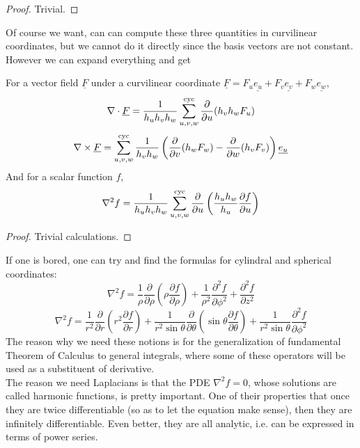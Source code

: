 \begin{proof}
    Trivial.
\end{proof}
Of course we want, can can compute these three quantities in curvilinear coordinates, but we cannot do it directly since the basis vectors are not constant.
However we can expand everything and get
\begin{proposition}
    For a vector field $\underline{F}$ under a curvilinear coordinate $\underline{F}=F_u\underline{e_u}+F_v\underline{e_v}+F_w\underline{e_w}$,
    $$\nabla\cdot\underline{F}=\frac{1}{h_uh_vh_w}\sum_{u,v,w}^{\rm cyc}\frac{\partial}{\partial u}(h_vh_wF_u)$$
    $$\nabla\times\underline{F}=\sum_{u,v,w}^{\rm cyc}\frac{1}{h_vh_w}\left( \frac{\partial}{\partial v}(h_wF_w)-\frac{\partial}{\partial w}(h_vF_v) \right)\underline{e_u}$$
    And for a scalar function $f$,
    $$\nabla^2f=\frac{1}{h_uh_vh_w}\sum_{u,v,w}^{\rm cyc}\frac{\partial}{\partial u}\left(\frac{h_uh_w}{h_u}\frac{\partial f}{\partial u}\right)$$
\end{proposition}
\begin{proof}
    Trivial calculations.
\end{proof}
If one is bored, one can try and find the formulas for cylindral and spherical coordinates:
$$\nabla^2f=\frac{1}{\rho}\frac{\partial}{\partial\rho}\left( \rho\frac{\partial f}{\partial\rho} \right)+\frac{1}{\rho^2}\frac{\partial^2f}{\partial \phi^2}+\frac{\partial^2f}{\partial z^2}$$
$$\nabla^2f=\frac{1}{r^2}\frac{\partial}{\partial r}\left( r^2\frac{\partial f}{\partial r} \right)+\frac{1}{r^2\sin\theta}\frac{\partial}{\partial\theta}\left( \sin\theta\frac{\partial f}{\partial\theta} \right)+\frac{1}{r^2\sin\theta}\frac{\partial^2f}{\partial\phi^2}$$
The reason why we need these notions is for the generalization of fundamental Theorem of Calculus to general integrals, where some of these operators will be used as a substituent of derivative.\\
The reason we need Laplacians is that the PDE $\nabla^2f=0$, whose solutions are called harmonic functions, is pretty important.
One of their properties that once they are twice differentiable (so as to let the equation make sense), then they are infinitely differentiable.
Even better, they are all analytic, i.e. can be expressed in terms of power series.
